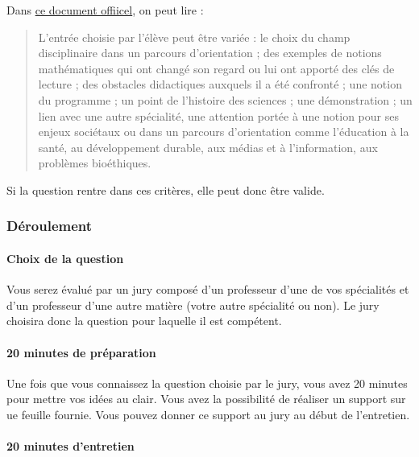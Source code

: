 \documentclass[
  letterpaper,
  DIV=11,
  numbers=noendperiod]{scrartcl}
\let\oldparagraph\paragraph
\renewcommand{\paragraph}[1]{\oldparagraph{#1}\mbox{}}
\begin{document}
Dans \href{https://eduscol.education.fr/media/3925/download}{ce document
offiicel}, on peut lire :

\begin{quote}
L'entrée choisie par l'élève peut être variée : le choix du champ
disciplinaire dans un parcours d'orientation ; des exemples de notions
mathématiques qui ont changé son regard ou lui ont apporté des clés de
lecture ; des obstacles didactiques auxquels il a été confronté ; une
notion du programme ; un point de l'histoire des sciences ; une
démonstration ; un lien avec une autre spécialité, une attention portée
à une notion pour ses enjeux sociétaux ou dans un parcours d'orientation
comme l'éducation à la santé, au développement durable, aux médias et à
l'information, aux problèmes bioéthiques.
\end{quote}

Si la question rentre dans ces critères, elle peut donc être valide.

\hypertarget{duxe9roulement}{%
\subsubsection{Déroulement}\label{duxe9roulement}}

\hypertarget{choix-de-la-question}{%
\paragraph{Choix de la question}\label{choix-de-la-question}}

Vous serez évalué par un jury composé d'un professeur d'une de vos
spécialités et d'un professeur d'une autre matière (votre autre
spécialité ou non). Le jury choisira donc la question pour laquelle il
est compétent.

\hypertarget{minutes-de-pruxe9paration}{%
\paragraph{20 minutes de préparation}\label{minutes-de-pruxe9paration}}

Une fois que vous connaissez la question choisie par le jury, vous avez
20 minutes pour mettre vos idées au clair. Vous avez la possibilité de
réaliser un support sur ue feuille fournie. Vous pouvez donner ce
support au jury au début de l'entretien.

\hypertarget{minutes-dentretien}{%
\paragraph{20 minutes d'entretien}\label{minutes-dentretien}}
\end{document}
